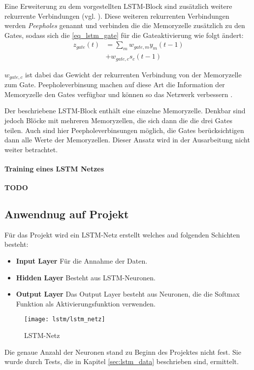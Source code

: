 Eine Erweiterung zu dem vorgestellten \ac{LSTM}-Block sind zusätzlich weitere
rekurrente Verbindungen (vgl. \cite{Gers2002b}). Diese weiteren rekurrenten
Verbindungen werden \textit{Peepholes} genannt und verbinden die die Memoryzelle
zusätzlich zu den Gates, sodass sich die \autoref{eq_lstm_gate} für die Gateaktivierung
wie folgt ändert:
\begin{equation}
\label{eq_lstm_gate_peephole}
\begin{split}
z_{gate}(t) &= \sum \limits_{m} w_{gate,m}y_m(t-1) \\
			&+ w_{gate,c} s_c(t-1)
\end{split}
\end{equation}

$w_{gate,c}$ ist dabei das Gewicht der rekurrenten Verbindung von der
Memoryzelle zum Gate. Peepholeverbinsung machen auf diese Art die Information
der Memoryzelle den Gates verfügbar und können so das Netzwerk verbessern
\cite{Gers2002b}. 

Der beschriebene \ac{LSTM}-Block enthält eine einzelne Memoryzelle. Denkbar sind
jedoch Blöcke mit mehreren Memoryzellen, die sich dann die die drei Gates
teilen. Auch sind hier Peepholeverbinsungen möglich, die Gates berücksichtigen
dann alle Werte der Memoryzellen. Dieser Ansatz wird in der Ausarbeitung nicht
weiter betrachtet. 

\paragraph{Training eines \ac{LSTM} Netzes}
\textbf{TODO}

\subsection{Anwendnug auf Projekt}
Für das Projekt wird ein LSTM-Netz erstellt welches aud folgenden Schichten besteht:

\begin{itemize}
\item \textbf{Input Layer} Für die Annahme der Daten.
\item \textbf{Hidden Layer} Besteht aus LSTM-Neuronen.
\item \textbf{Output Layer} Das Output Layer besteht aus Neuronen, die die 
Softmax Funktion als Aktivierungsfunktion verwenden.
\end{itemize}

\begin{figure}[htbp]
    \centering
   \texttt{[image: lstm/lstm\_netz]}
\caption{LSTM-Netz}
\label{fig:lstm_netz}
\end{figure}
Die genaue Anzahl der Neuronen stand zu Beginn des Projektes nicht fest. 
Sie wurde durch Tests, die in Kapitel \autoref{sec:lstm_data} beschrieben sind, ermittelt.

